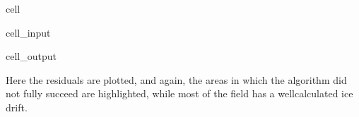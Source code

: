 \documentclass[letterpaper,10pt,english]{jupyterBook}
\begin{document}
\begin{sphinxuseclass}{cell}
\begin{sphinxVerbatimInput}
\begin{sphinxuseclass}{cell_input}
\end{sphinxuseclass}\end{sphinxVerbatimInput}
\begin{sphinxVerbatimOutput}

\begin{sphinxuseclass}{cell_output}
\noindent{}

\end{sphinxuseclass}\end{sphinxVerbatimOutput}

\end{sphinxuseclass}
\sphinxAtStartPar
Here the residuals are plotted, and again, the areas in which the algorithm did not fully succeed are highlighted, while most of the field has a well\sphinxhyphen{}calculated ice drift.
\end{document}
